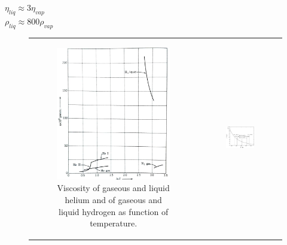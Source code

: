 \documentclass{article}
\begin{document}
$\eta_{liq} \approx 3 \eta_{vap}$
\\

$\rho_{liq} \approx 800 \rho_{vap}$
\\

\begin{figure}[H]
    \centering
    \begin{tabular}{cc}
        \begin{subfigure}{0.5\textwidth}
            \centering
            \includegraphics[width=\linewidth]{Images/Viscosity.png}
            \caption{Viscosity of gaseous and liquid helium and of gaseous and liquid hydrogen as function of temperature.}
            \label{fig:enter-label}
        \end{subfigure} &
        \begin{subfigure}{0.5\textwidth}
            \centering
            \includegraphics[width=\linewidth]{Images/waterVis.png}

\end{subfigure}
\end{tabular}
\end{figure}
\end{document}
